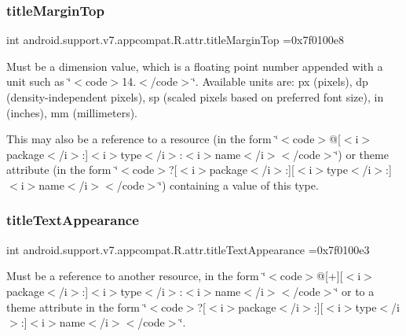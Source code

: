 \subsubsection{\texorpdfstring{title\+Margin\+Top}{titleMarginTop}}
{\footnotesize\ttfamily int android.\+support.\+v7.\+appcompat.\+R.\+attr.\+title\+Margin\+Top =0x7f0100e8\hspace{0.3cm}{\ttfamily [static]}}

Must be a dimension value, which is a floating point number appended with a unit such as \char`\"{}$<$code$>$14.\+5sp$<$/code$>$\char`\"{}. Available units are\+: px (pixels), dp (density-\/independent pixels), sp (scaled pixels based on preferred font size), in (inches), mm (millimeters). 

This may also be a reference to a resource (in the form \char`\"{}$<$code$>$@\mbox{[}$<$i$>$package$<$/i$>$\+:\mbox{]}$<$i$>$type$<$/i$>$\+:$<$i$>$name$<$/i$>$$<$/code$>$\char`\"{}) or theme attribute (in the form \char`\"{}$<$code$>$?\mbox{[}$<$i$>$package$<$/i$>$\+:\mbox{]}\mbox{[}$<$i$>$type$<$/i$>$\+:\mbox{]}$<$i$>$name$<$/i$>$$<$/code$>$\char`\"{}) containing a value of this type. \mbox{\label{classandroid_1_1support_1_1v7_1_1appcompat_1_1R_1_1attr_a1025276e3fbb799cf954a6774ad2ec97}} 
\subsubsection{\texorpdfstring{title\+Text\+Appearance}{titleTextAppearance}}
{\footnotesize\ttfamily int android.\+support.\+v7.\+appcompat.\+R.\+attr.\+title\+Text\+Appearance =0x7f0100e3\hspace{0.3cm}{\ttfamily [static]}}

Must be a reference to another resource, in the form \char`\"{}$<$code$>$@\mbox{[}+\mbox{]}\mbox{[}$<$i$>$package$<$/i$>$\+:\mbox{]}$<$i$>$type$<$/i$>$\+:$<$i$>$name$<$/i$>$$<$/code$>$\char`\"{} or to a theme attribute in the form \char`\"{}$<$code$>$?\mbox{[}$<$i$>$package$<$/i$>$\+:\mbox{]}\mbox{[}$<$i$>$type$<$/i$>$\+:\mbox{]}$<$i$>$name$<$/i$>$$<$/code$>$\char`\"{}. \mbox{\label{classandroid_1_1support_1_1v7_1_1appcompat_1_1R_1_1attr_a597dc103e0e2288dfc7bd92d961bc837}} 
